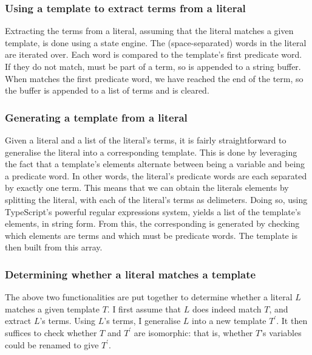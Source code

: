\documentclass[../main.tex]{subfiles}
\begin{document}
\subsubsection{Using a template to extract terms from a literal}
Extracting the terms from a literal, assuming that the literal matches a given template, is done using a state engine. The (space-separated) words in the literal are iterated over. Each word  is compared to the template's first predicate word. \\ 
If they do not match,  must be part of a term, so  is appended to a string buffer. When  matches the first predicate word, we have reached the end of the term, so the buffer is appended to a list of terms and is cleared.


\subsubsection{Generating a template from a literal}
Given a literal and a list of the literal's terms, it is fairly straightforward to generalise the literal into a corresponding template. This is done by leveraging the fact that a template's elements alternate between being a variable and being a predicate word. In other words, the literal's predicate words are each separated by exactly one term. This means that we can obtain the literals elements by splitting the literal, with each of the literal's terms as delimeters. Doing so, using TypeScript's powerful regular expressions system, yields a list of the template's elements, in string form. From this, the corresponding  is generated by checking which elements are terms and which must be predicate words. The template is then built from this array.


\subsubsection{Determining whether a literal matches a template}
The above two functionalities are put together to determine whether a literal $L$ matches a given template $T$. I first assume that $L$ does indeed match $T$, and extract $L$'s terms. Using $L$'s terms, I generalise $L$ into a new template $T^\prime$. It then suffices to check whether $T$ and $T^\prime$ are isomorphic: that is, whether $T$'s variables could be renamed to give $T^\prime$.
\end{document}
